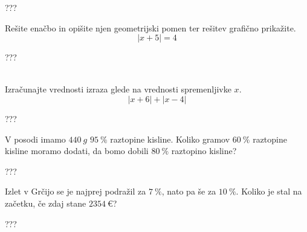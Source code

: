 \documentclass[addpoints]{exam}
\begin{document}
\begin{questions}
    
    
    \begin{solution}[10cm]
        ???
    \end{solution}




    \question[5]
    Rešite enačbo in opišite njen geometrijski pomen ter rešitev grafično prikažite.
    $$  \left\lvert x+5\right\rvert=4 $$
    
    
    \begin{solution}[8cm]
        ???
    \end{solution}


    \newpage


    ~\\



    \question[5]
    Izračunajte vrednosti izraza glede na vrednosti spremenljivke $x$.
    $$\left\lvert x+6 \right\rvert + \left\lvert x-4 \right\rvert $$
    
    
    \begin{solution}[10cm]
        ???
    \end{solution}



    \question[4]
    V posodi imamo $440~g$ $95~\%$ raztopine kisline. Koliko gramov $60~\%$ raztopine kisline moramo dodati, da bomo dobili $80~\%$ raztopino kisline?
    
    
    \begin{solution}[7cm]
        ???
    \end{solution}



    \newpage

    \question[4]
    Izlet v Grčijo se je najprej podražil za $7~\%$, nato pa še za $10~\%$. 
    Koliko je stal na začetku, če zdaj stane $2354~€$?
    
    
    \begin{solution}[3cm]
        ???
    \end{solution}

     \newpage



    

\end{questions}
\end{document}
